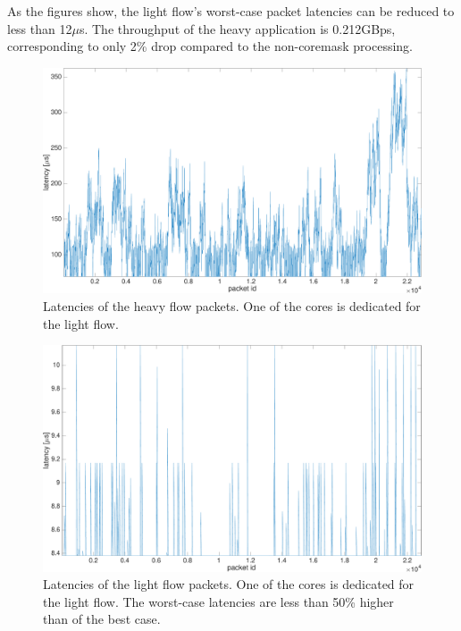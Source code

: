 As the figures show, the light flow's worst-case packet latencies can be reduced to less than 12$\mu$s. The throughput of the heavy application is 0.212GBps, corresponding to only 2\% drop compared to the non-coremask processing.

\begin{figure}[]
  \begin{center}
    \includegraphics[width=\textwidth]{images/experiment/exp2-app1-is-coremask-latency.pdf}
    \caption{Latencies of the heavy flow packets. One of the cores is dedicated for the light flow.}
    \label{fig:exp2-app1-is-coremask-latency}
  \end{center}
\end{figure}

\begin{figure}[]
  \begin{center}
    \includegraphics[width=\textwidth]{images/experiment/exp2-app2-is-coremask-latency.pdf}
    \caption{Latencies of the light flow packets. One of the cores is dedicated for the light flow. The worst-case latencies are less than 50\% higher than of the best case.}
    \label{fig:exp2-app2-is-coremask-latency}
  \end{center}
\end{figure}

